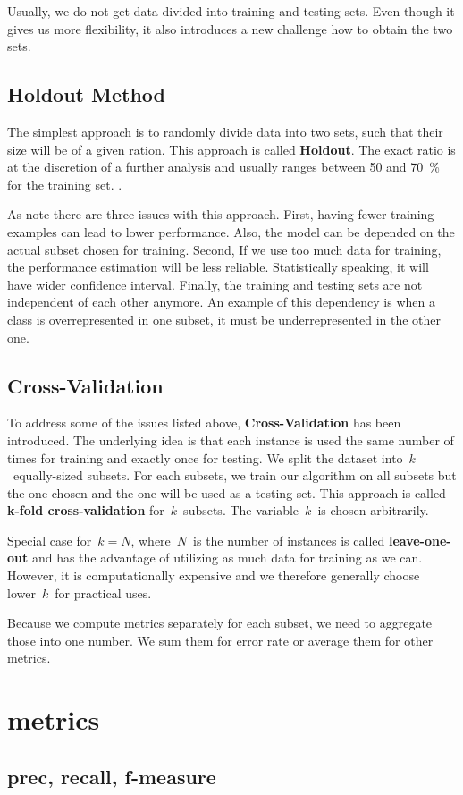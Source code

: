 Usually, we do not get data divided into training and testing sets.
Even though it gives us more flexibility, it also introduces a new challenge how to obtain the two sets.

\subsection{Holdout Method}

The simplest approach is to randomly divide data into two sets, such that their size will be of a given ration.
This approach is called {\bf Holdout}.
The exact ratio is at the discretion of a further analysis and usually ranges between 50 and 70~\% for the training set. .

As \citet{TanBachKum08} note there are three issues with this approach.
First, having fewer training examples can lead to lower performance.
Also, the model can be depended on the actual subset chosen for training.
Second, If we use too much data for training, the performance estimation will be less reliable.
Statistically speaking, it will have wider confidence interval.
Finally, the training and testing sets are not independent of each other anymore.
An example of this dependency is when a class is overrepresented in one subset, it must be underrepresented in the other one.

\subsection{Cross-Validation}

To address some of the issues listed above, {\bf Cross-Validation} has been introduced.
The underlying idea is that each instance is used the same number of times for training and exactly once for testing.
We split the dataset into~$k$~equally-sized subsets.
For each subsets, we train our algorithm on all subsets but the one chosen and the one will be used as a testing set.
This approach is called {\bf k-fold cross-validation} for~$k$~subsets. The variable~$k$~is chosen arbitrarily.

Special case for~$k=N$, where~$N$~is the number of instances is called {\bf leave-one-out} and has the advantage of 
utilizing as much data for training as we can.
However, it is computationally expensive and we therefore generally choose lower~$k$~for practical uses.

Because we compute metrics separately for each subset, we need to aggregate those into one number.
We sum them for error rate or average them for other metrics. 




\section{metrics}

\subsection{prec, recall, f-measure}






